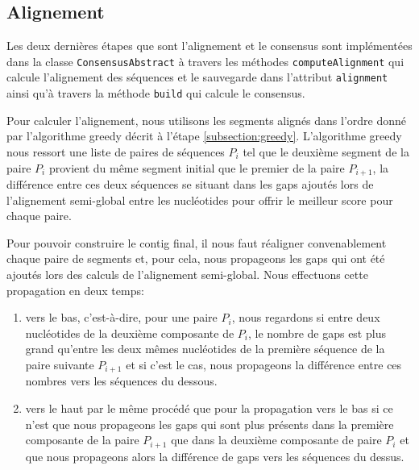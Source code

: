 
\subsection{Alignement}
\label{subsection:alignment}

Les deux dernières étapes que sont l'alignement et le consensus sont
implémentées dans la classe \verb|ConsensusAbstract| à travers les méthodes
\verb|computeAlignment| qui calcule l'alignement des séquences et le sauvegarde
dans l'attribut \verb|alignment| ainsi qu'à travers la méthode \verb|build|
qui calcule le consensus.

Pour calculer l'alignement, nous utilisons les segments alignés dans l'ordre
donné par l'algorithme greedy décrit à l'étape \ref{subsection:greedy}.
L'algorithme greedy nous ressort une liste de paires de séquences $P_{i}$ tel
que le deuxième segment de la paire $P_{i}$ provient du même segment initial que
le premier de la paire $P_{i + 1}$, la différence entre ces deux séquences se
situant dans les gaps ajoutés lors de l'alignement semi-global entre les
nucléotides pour offrir le meilleur score pour chaque paire.


Pour pouvoir construire le contig final, il nous faut réaligner convenablement
chaque paire de segments et, pour cela, nous propageons les gaps qui ont été
ajoutés lors des calculs de l'alignement semi-global. Nous effectuons cette
propagation en deux temps:

\begin{enumerate}
	\item vers le bas, c'est-à-dire, pour une paire $P_{i}$, nous regardons si
		entre deux nucléotides de la deuxième composante de $P_{i}$, le nombre
		de gaps est plus grand qu'entre les deux mêmes nucléotides de la
		première séquence de la paire suivante $P_{i + 1}$ et si c'est le cas,
		nous propageons la différence entre ces nombres vers les séquences du
		dessous.
	\item vers le haut par le même procédé que pour la propagation vers le bas
		si ce n'est que nous propageons les gaps qui sont plus présents dans la
		première composante de la paire $P_{i + 1}$ que dans la deuxième
		composante de paire $P_{i}$ et que nous propageons alors la différence
		de gaps vers les séquences du dessus.
\end{enumerate}


